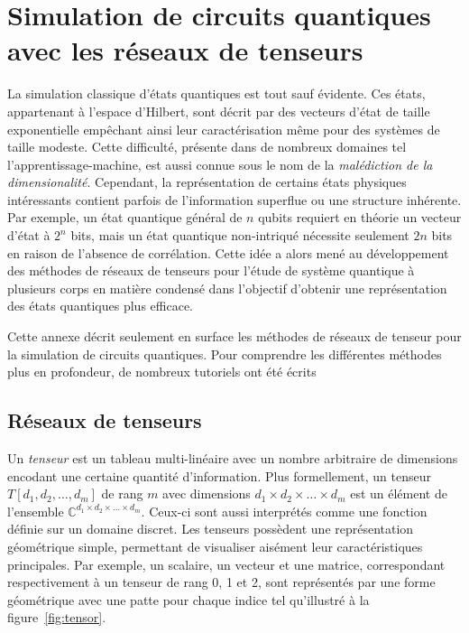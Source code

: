 \chapter{Simulation de circuits quantiques avec les réseaux de tenseurs}
\label{cha:simulation-circuits-quantiques-avec-reseaux-de-tenseurs}

La simulation classique d'états quantiques est tout sauf évidente. Ces états, appartenant à l'espace d'Hilbert, sont décrit par des vecteurs d'état de taille exponentielle empêchant ainsi leur caractérisation même pour des systèmes de taille modeste. Cette difficulté, présente dans de nombreux domaines tel l'apprentissage-machine, est aussi connue sous le nom de la \textit{malédiction de la dimensionalité}. Cependant, la représentation de certains états physiques intéressants contient parfois de l'information superflue ou une structure inhérente. Par exemple, un état quantique général de $n$ qubits requiert en théorie un vecteur d'état à $2^{n}$ bits, mais un état quantique non-intriqué nécessite seulement $2n$ bits en raison de l'absence de corrélation. Cette idée a alors mené au développement des méthodes de réseaux de tenseurs pour l'étude de système quantique à plusieurs corps en matière condensé dans l'objectif d'obtenir une représentation des états quantiques plus efficace. 

Cette annexe décrit seulement en surface les méthodes de réseaux de tenseur pour la simulation de circuits quantiques. Pour comprendre les différentes méthodes plus en profondeur, de nombreux tutoriels ont été écrits~\cite{bridgemanHandwavingInterpretiveDance2017a,biamonteTensorNetworksNutshell2017a,bakerMethodesCalculAvec2021a}


\section{Réseaux de tenseurs}


Un \textit{tenseur} est un tableau multi-linéaire avec un nombre arbitraire de dimensions encodant une certaine quantité d'information. Plus formellement, un tenseur $T[d_{1}, d_{2}, \dots, d_{m}]$ de rang $m$ avec dimensions $d_{1} \times d_{2} \times \dots \times d_{m}$ est un élément de l'ensemble $\mathbb{C}^{d_{1} \times d_{2} \times \dots \times d_{m}}$. Ceux-ci sont aussi interprétés comme une fonction définie sur un domaine discret. Les tenseurs possèdent une représentation géométrique simple, permettant de visualiser aisément leur caractéristiques principales. Par exemple, un scalaire, un vecteur et une matrice, correspondant respectivement à un tenseur de rang 0, 1 et 2, sont représentés par une forme géométrique avec une patte pour chaque indice tel qu'illustré à la figure~\ref{fig:tensor}.

